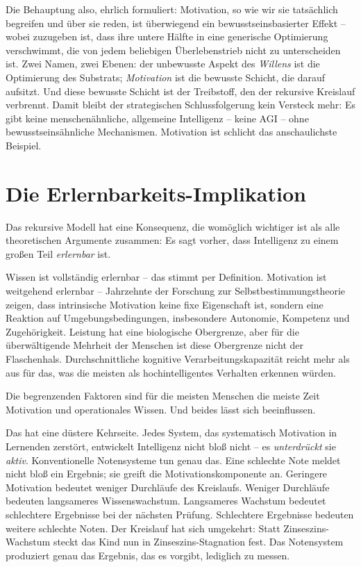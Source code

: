 \documentclass[11pt, twoside, openright]{book}
\begin{document}
Die Behauptung also, ehrlich formuliert: Motivation, so wie wir sie tatsächlich begreifen und über sie reden, ist überwiegend ein bewusstseinsbasierter Effekt -- wobei zuzugeben ist, dass ihre untere Hälfte in eine generische Optimierung verschwimmt, die von jedem beliebigen Überlebenstrieb nicht zu unterscheiden ist. Zwei Namen, zwei Ebenen: der unbewusste Aspekt des \textit{Willens} ist die Optimierung des Substrats; \textit{Motivation} ist die bewusste Schicht, die darauf aufsitzt. Und diese bewusste Schicht ist der Treibstoff, den der rekursive Kreislauf verbrennt. Damit bleibt der strategischen Schlussfolgerung kein Versteck mehr: Es gibt keine menschenähnliche, allgemeine Intelligenz -- keine AGI -- ohne bewusstseinsähnliche Mechanismen. Motivation ist schlicht das anschaulichste Beispiel.

\section*{Die Erlernbarkeits-Implikation}

Das rekursive Modell hat eine Konsequenz, die womöglich wichtiger ist als alle theoretischen Argumente zusammen: Es sagt vorher, dass Intelligenz zu einem großen Teil \textit{erlernbar} ist.

Wissen ist vollständig erlernbar -- das stimmt per Definition. Motivation ist weitgehend erlernbar -- Jahrzehnte der Forschung zur Selbstbestimmungstheorie zeigen, dass intrinsische Motivation keine fixe Eigenschaft ist, sondern eine Reaktion auf Umgebungsbedingungen, insbesondere Autonomie, Kompetenz und Zugehörigkeit. Leistung hat eine biologische Obergrenze, aber für die überwältigende Mehrheit der Menschen ist diese Obergrenze nicht der Flaschenhals. Durchschnittliche kognitive Verarbeitungskapazität reicht mehr als aus für das, was die meisten als hochintelligentes Verhalten erkennen würden.

Die begrenzenden Faktoren sind für die meisten Menschen die meiste Zeit Motivation und operationales Wissen. Und beides lässt sich beeinflussen.

Das hat eine düstere Kehrseite. Jedes System, das systematisch Motivation in Lernenden zerstört, entwickelt Intelligenz nicht bloß nicht -- es \textit{unterdrückt} sie \textit{aktiv}. Konventionelle Notensysteme tun genau das. Eine schlechte Note meldet nicht bloß ein Ergebnis; sie greift die Motivationskomponente an. Geringere Motivation bedeutet weniger Durchläufe des Kreislaufs. Weniger Durchläufe bedeuten langsameres Wissenswachstum. Langsameres Wachstum bedeutet schlechtere Ergebnisse bei der nächsten Prüfung. Schlechtere Ergebnisse bedeuten weitere schlechte Noten. Der Kreislauf hat sich umgekehrt: Statt Zinseszins-Wachstum steckt das Kind nun in Zinseszins-Stagnation fest. Das Notensystem produziert genau das Ergebnis, das es vorgibt, lediglich zu messen.
\end{document}
